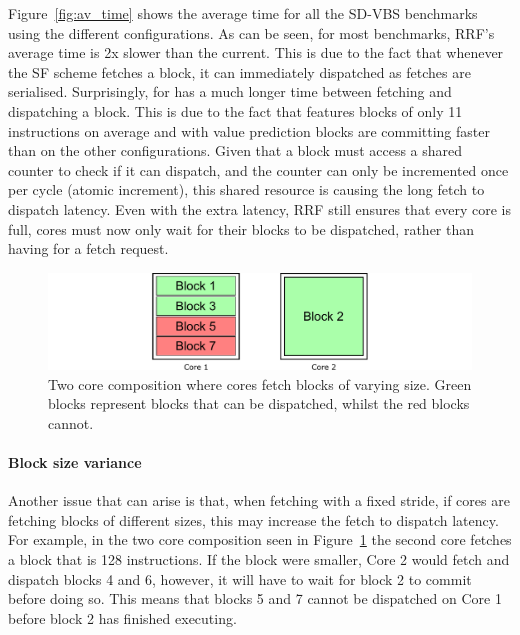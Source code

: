 Figure~\ref{fig:av_time} shows the average time for all the SD-VBS benchmarks using the different configurations.
As can be seen, for most benchmarks, RRF's average time is 2x slower than the current.
This is due to the fact that whenever the SF scheme fetches a block, it can immediately dispatched as fetches are serialised.
Surprisingly,  for \nfvp{} has a much longer time between fetching and dispatching a block.
This is due to the fact that  features blocks of only 11 instructions on average and with value prediction blocks are committing faster than on the other configurations.
Given that a block must access a shared counter to check if it can dispatch, and the counter can only be incremented once per cycle (atomic increment), this shared resource is causing the long fetch to dispatch latency.
Even with the extra latency, RRF still ensures that every core is full, cores must now only wait for their blocks to be dispatched, rather than having for a fetch request.

\begin{figure}[t]
    \centering
    \includegraphics[width=1\textwidth]{chapter3/graphics/fetch_ex.pdf}
    \caption{Two core composition where cores fetch blocks of varying size. Green blocks represent blocks that can be dispatched, whilst the red blocks cannot.}
    \label{fig:var_ex}
	\vspace{1em}
\end{figure}

\paragraph*{Block size variance}
Another issue that can arise is that, when fetching with a fixed stride, if cores are fetching blocks of different sizes, this may increase the fetch to dispatch latency.
For example, in the two core composition seen in Figure~\ref{fig:var_ex} the second core fetches a block that is 128 instructions.
If the block were smaller, Core 2 would fetch and dispatch blocks 4 and 6, however, it will have to wait for block 2 to commit before doing so.
This means that blocks 5 and 7 cannot be dispatched on Core 1 before block 2 has finished executing.

